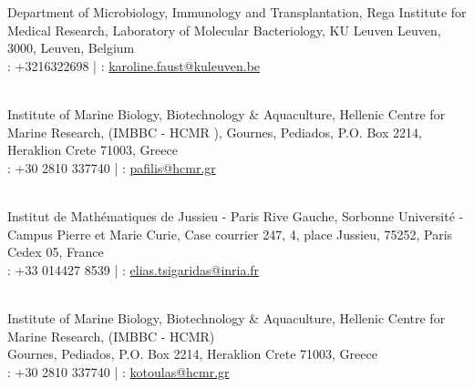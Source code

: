 \documentclass[
    a4paper,
]{fortysecondscv}
\begin{document}
\begin{cvtable}


        {Department of Microbiology, Immunology and Transplantation, Rega Institute for Medical Research, Laboratory of Molecular Bacteriology, KU Leuven
        Leuven, 3000, Leuven, Belgium
        \\ 
        \faPhone: +3216322698 | 
        \faAt: \href{mailto:karoline.faust@kuleuven.be}{karoline.faust@kuleuven.be}}
      
    \\ 


        {Institute of Marine Biology, Biotechnology \& Aquaculture, Hellenic Centre for Marine Research, (IMBBC - HCMR
        ),
        Gournes, Pediados, P.O. Box 2214, Heraklion Crete 71003, Greece \\ \faPhone: +30 2810 337740 | 
        \faAt: \href{mailto:pafilis@hcmr.gr}{pafilis@hcmr.gr}}
        
    \\
      
      

    
        {Institut de Mathématiques de Jussieu - Paris Rive Gauche, Sorbonne Université - Campus Pierre et Marie Curie, Case courrier 247, 4, place Jussieu, 75252, Paris Cedex 05, France \\ 
        \faPhone: +33 014427 8539 | \faAt: \href{mailto: elias.tsigaridas@inria.fr}{elias.tsigaridas@inria.fr}}

    \\


        {Institute of Marine Biology, Biotechnology \& Aquaculture, Hellenic Centre for Marine Research, (IMBBC - HCMR) \\
        Gournes, Pediados, P.O. Box 2214, Heraklion Crete 71003, Greece \\ \faPhone: +30 2810 337740 | 
        \faAt: \href{mailto:kotoulas@hcmr.gr}{kotoulas@hcmr.gr}} 




\end{cvtable}
\end{document}
